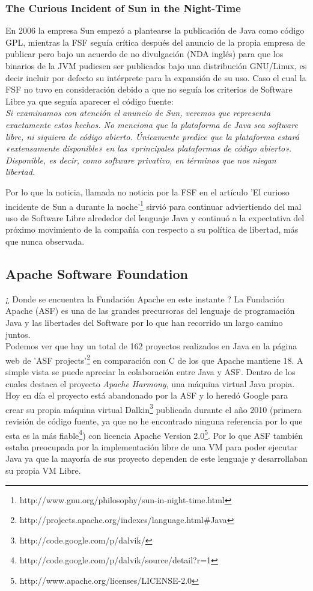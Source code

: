 \documentclass[11pt]{scrartcl}
\begin{document}
\subsubsection{The Curious Incident of Sun in the Night-Time}

En 2006 la empresa Sun empezó a plantearse la publicación de Java como código GPL, mientras la FSF seguía crítica después del anuncio de la propia empresa de publicar pero bajo un acuerdo de no divulgación (NDA inglés) para que los binarios de la JVM pudiesen ser publicados bajo una distribución GNU/Linux, es decir incluir por defecto su intérprete para la expansión de su uso. Caso el cual la FSF no tuvo en consideración debido a que no seguía los criterios de Software Libre ya que seguía aparecer el código fuente:\\

    \emph{Si examinamos con atención el anuncio de Sun, veremos que representa exactamente estos hechos. No menciona que la plataforma de Java sea software libre, ni siquiera de código abierto. Únicamente predice que la plataforma estará «extensamente disponible» en las «principales plataformas de código abierto». Disponible, es decir, como software privativo, en términos que nos niegan libertad.}

Por lo que la noticia, llamada no noticia por la FSF en el artículo 'El curioso incidente de Sun a durante la noche'\footnote{http://www.gnu.org/philosophy/sun-in-night-time.html} sirvió para continuar adviertiendo del mal uso de Software Libre alrededor del lenguaje Java y continuó a la expectativa del próximo movimiento de la compañía con respecto a su política de libertad, más que nunca observada.

\subsection{Apache Software Foundation}

¿ Donde se encuentra la Fundación Apache en este instante ? La Fundación Apache (ASF) es una de las grandes precursoras del lenguaje de programación Java y las libertades del Software por lo que han recorrido un largo camino juntos.\\
Podemos ver que hay un total de 162 proyectos realizados en Java en la página web de 'ASF projects'\footnote{http://projects.apache.org/indexes/language.html\#Java} en comparación con C de los que Apache mantiene 18. A simple vista se puede apreciar la colaboración entre Java y ASF. Dentro de los cuales destaca el proyecto \emph{Apache Harmony}, una máquina virtual Java propia. Hoy en día el proyecto está abandonado por la ASF y lo heredó Google para crear su propia máquina virtual Dalkin\footnote{http://code.google.com/p/dalvik/} publicada durante el año 2010 (primera revisión de código fuente, ya que no he encontrado ninguna referencia por lo que esta es la más fiable\footnote{http://code.google.com/p/dalvik/source/detail?r=1}) con licencia Apache Version 2.0\footnote{http://www.apache.org/licenses/LICENSE-2.0}. Por lo que ASF también estaba preocupada por la implementación libre de una VM para poder ejecutar Java ya que la mayoría de sus proyecto dependen de este lenguaje y desarrollaban su propia VM Libre.
\end{document}
